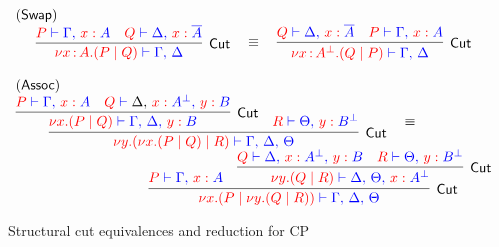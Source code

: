 \begin{figure*}
\[\colored
\begin{array}{c}
\multicolumn{1}{l}{(\Swap)}\filler \\ %
\vcenter{
  \inference{
    \tm{P} \tpvdash \tp{\Gamma \comma \tmof{x}A}
    &
    \tm{Q} \tpvdash \tp{\Delta \comma \tmof{x}\dual{A}}
  }{Cut}{
    \tm{\nu x \of{A}.(P \mid Q)} \tpvdash \tp{\Gamma \comma \Delta}
  }
}
\quad \equiv \quad
\vcenter{
  \inference{
    \tm{Q} \tpvdash \tp{\Delta \comma \tmof{x}\dual{A}}
    &
    \tm{P} \tpvdash \tp{\Gamma \comma \tmof{x}A}
  }{Cut}{
    \tm{\nu x \of{A^\bot}.(Q \mid P)} \tpvdash \tp{\Gamma \comma \Delta}
  }
}

\\~\\

\multicolumn{1}{l}{(\Assoc)} \\ %
\vcenter{
  \inference{
    \inference{
      \tm{P} \tpvdash \tp{\Gamma \comma \tmof{x}A}
      &
      \tm{Q} \tpvdash \Delta \comma \tp{\tmof{x}A^\bot \comma \tmof{y}B}
    }{Cut}{
      \tm{\nu x \Of{A}.(P \mid Q)} \tpvdash \tp{\Gamma \comma \Delta \comma \tmof{y}B}
    }
    &
    \tm{R} \tpvdash \tp{\Theta \comma \tmof{y}B^\bot}
  }{Cut}{
    \tm{\nu y \Of{B}.(\nu x \Of{A}.(P \mid Q) \mid R)} \tpvdash 
      \tp{\Gamma \comma \Delta \comma \Theta}
  }
}
\quad \equiv \hfill \\ \hfill
\vcenter{
  \inference{
    \tm{P} \tpvdash \tp{\Gamma \comma \tmof{x}A}
    &
    \inference{
      \tm{Q} \tpvdash \tp{\Delta \comma \tmof{x}A^\bot \comma \tmof{y}B}
      &
      \tm{R} \tpvdash \tp{\Theta \comma \tmof{y}B^\bot}
    }{Cut}{
      \tm{\nu y \Of{B}.(Q \mid R)} \tpvdash \tp{\Delta \comma \Theta \comma \tmof{x}A^\bot}
    }
  }{Cut}{
    \tm{\nu x \Of{A}.(P \mid \nu y \Of{B}.(Q \mid R))} \tpvdash
      \tp{\Gamma \comma \Delta \comma \Theta}
  }
}

\end{array}
\]
\caption{Structural cut equivalences and reduction for CP}
\label{fig:structural}
\end{figure*}
